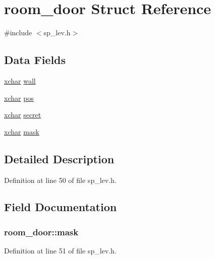 \hypertarget{structroom__door}{\section{room\+\_\+door Struct Reference}
\label{structroom__door}
}


{\ttfamily \#include $<$sp\+\_\+lev.\+h$>$}

\subsection*{Data Fields}
\begin{DoxyCompactItemize}
\item 
\hyperlink{global_8h_a2043b7d01ce89f4ee2fa6c345a752d32}{xchar} \hyperlink{structroom__door_a13f0f81ab36e5b33140d3987f76db7a7}{wall}
\item 
\hyperlink{global_8h_a2043b7d01ce89f4ee2fa6c345a752d32}{xchar} \hyperlink{structroom__door_abb4701d0723c3bf87ede3b5a27be2488}{pos}
\item 
\hyperlink{global_8h_a2043b7d01ce89f4ee2fa6c345a752d32}{xchar} \hyperlink{structroom__door_ad5d5bcf94d0f67472c5a17c3bc8907f1}{secret}
\item 
\hyperlink{global_8h_a2043b7d01ce89f4ee2fa6c345a752d32}{xchar} \hyperlink{structroom__door_a32c276de3583b9d2d505c79cccfd7456}{mask}
\end{DoxyCompactItemize}


\subsection{Detailed Description}


Definition at line 50 of file sp\+\_\+lev.\+h.



\subsection{Field Documentation}
\hypertarget{structroom__door_a32c276de3583b9d2d505c79cccfd7456}{
\subsubsection[{mask}]{ room\+\_\+door\+::mask}}\label{structroom__door_a32c276de3583b9d2d505c79cccfd7456}


Definition at line 51 of file sp\+\_\+lev.\+h.



